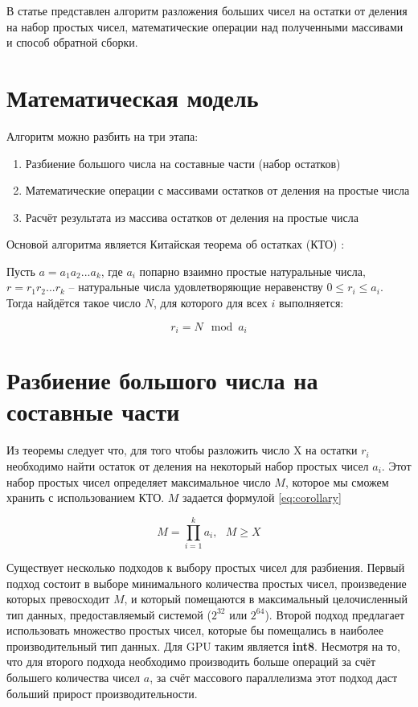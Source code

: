 \documentclass[10pt]{article}
\begin{document}
В статье представлен алгоритм разложения больших чисел на остатки от деления на набор простых чисел, математические операции над полученными массивами и способ обратной сборки.

\section{Математическая модель} 

Алгоритм можно разбить на три этапа: 

\begin{enumerate}
	\item Разбиение большого числа на составные части (набор остатков)
	\item Математические операции с массивами остатков от деления на простые числа
	\item Расчёт результата из массива остатков от деления на простые числа
\end{enumerate}

Основой алгоритма является Китайская теорема об остатках (КТО) \cite{Okulov2011,Cormen2001}:

Пусть $a = a_1 a_2 ... a_k$, где $a_i$ попарно взаимно простые натуральные числа, $r = r_1 r_2 ... r_k$ -- натуральные числа удовлетворяющие неравенству $0 \leq r_i \le a_i$. Тогда найдётся такое число
$N$, для которого для всех $i$ выполняется:

\begin{equation}
	r_i=N \mod a_i
	\label{eq:rem_th}
\end{equation}

\section{Разбиение большого числа на составные части}

Из теоремы следует что, для того чтобы разложить число X на остатки $r_i$ необходимо найти остаток от деления на некоторый набор простых чисел $a_i$. Этот набор простых чисел определяет максимальное число $M$, которое мы сможем хранить с использованием КТО. $M$ задается формулой \ref{eq:corollary}

\begin{equation}
	M = \prod\limits_{i=1}^k a_i, ~~~ M \geqslant X
	\label{eq:corollary}
\end{equation}

Существует несколько подходов к выбору простых чисел для разбиения. Первый подход состоит в выборе минимального количества простых чисел, произведение которых превосходит $M$, и который помещаются в максимальный целочисленный тип данных, предоставляемый системой ($2^{32}$ или $2^{64}$). 
Второй подход предлагает использовать множество простых чисел, которые бы помещались в наиболее производительный тип данных. Для GPU таким является \textbf{int8}.
Несмотря на то, что для второго подхода необходимо производить больше операций за счёт большего количества чисел $a$, за счёт массового параллелизма этот подход даст больший прирост производительности.
\end{document}
